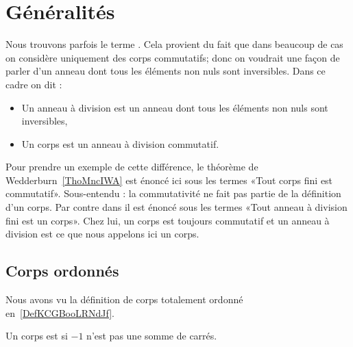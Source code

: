 
\section{Généralités}

\begin{normaltext}      \label{NORMooGPWRooIKJqqw}
    Nous trouvons parfois le terme . Cela provient du fait que dans beaucoup de cas on considère uniquement des corps commutatifs; donc on voudrait une façon de parler d'un anneau dont tous les éléments non nuls sont inversibles. Dans ce cadre on dit :
    \begin{itemize}
        \item Un anneau à division est un anneau dont tous les éléments non nuls sont inversibles,
        \item Un corps est un anneau à division commutatif.
    \end{itemize}
    Pour prendre un exemple de cette différence, le théorème de Wedderburn~\ref{ThoMncIWA} est énoncé ici sous les termes «Tout corps fini est commutatif». Sous-entendu : la commutativité ne fait pas partie de la définition d'un corps. Par contre dans \cite{KXjFWKA} il est énoncé sous les termes «Tout anneau à division fini est un corps». Chez lui, un corps est toujours commutatif et un anneau à division est ce que nous appelons ici un corps.
\end{normaltext}

\subsection{Corps ordonnés}

Nous avons vu la définition de corps totalement ordonné en~\ref{DefKCGBooLRNdJf}.

\begin{definition}
    Un corps est  si \( -1\) n'est pas une somme de carrés.
\end{definition}

